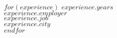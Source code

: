 $for(experience)$
  $experience.years$\\
  \textsc{$experience.employer$}\\
  \emph{$experience.job$}\\
  $experience.city$\\[.2cm]
$endfor$
